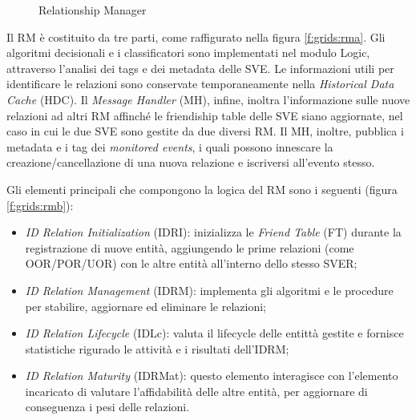 \begin{figure}[h!t]
\centering
{}
\qquad
{}
\caption{Relationship Manager}
\label{f:grids:rm}
\end{figure}

Il RM è costituito da tre parti, come raffigurato nella figura \ref{f:grids:rma}. Gli algoritmi decisionali e i classificatori sono implementati nel modulo Logic, attraverso l'analisi dei tags e dei metadata delle SVE. Le informazioni utili per identificare le relazioni sono conservate temporaneamente nella \textit{Historical Data Cache} (HDC). Il \textit{Message Handler} (MH), infine, inoltra l'informazione sulle nuove relazioni ad altri RM affinch\'e le friendiship table delle SVE siano aggiornate, nel caso in cui le due SVE sono gestite da due diversi RM. Il MH, inoltre, pubblica i metadata e i tag dei \textit{monitored events}, i quali possono innescare la creazione/cancellazione di una nuova relazione e iscriversi all'evento stesso.

Gli elementi principali che compongono la logica del RM sono i seguenti (figura \ref{f:grids:rmb}):

\begin{itemize}
    \item \textit{ID Relation Initialization} (IDRI): inizializza le \textit{Friend Table} (FT) durante la registrazione di nuove entità, aggiungendo le prime relazioni (come OOR/POR/UOR) con le altre entità all'interno dello stesso SVER;
    \item \textit{ID Relation Management} (IDRM): implementa gli algoritmi e le procedure per stabilire, aggiornare ed eliminare le relazioni;
    \item \textit{ID Relation Lifecycle} (IDLc): valuta il lifecycle delle entittà gestite e fornisce statistiche rigurado le attività e i risultati dell'IDRM;
    \item \textit{ID Relation Maturity} (IDRMat): questo elemento interagisce con l'elemento incaricato di valutare l'affidabilità delle altre entità, per aggiornare di conseguenza i pesi delle relazioni.
\end{itemize}

